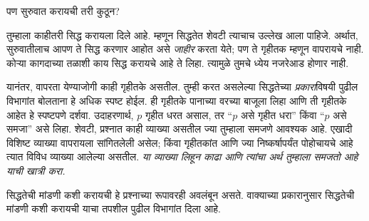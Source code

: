 \documentclass[../../../include/open-logic-section]{subfiles}
\begin{document}


पण सुरुवात करायची तरी कुठून?

तुम्हाला काहीतरी सिद्ध करायला दिले आहे. म्हणून सिद्धतेत शेवटी त्याचाच उल्लेख आला पाहिजे. अर्थात, सुरुवातीलाच आपण ते सिद्ध करणार आहोत असे \emph{जाहीर} करता येते; पण ते गृहीतक म्हणून वापरायचे नाही. कोऱ्या कागदाच्या तळाशी काय सिद्ध करायचे आहे ते लिहा. त्यामुळे तुमचे ध्येय नजरेआड होणार नाही.

यानंतर, वापरता येण्याजोगी काही गृहीतके असतील. तुम्ही करत असलेल्या सिद्धतेच्या \emph{प्रकारा}विषयी पुढील विभागांत बोलताना हे अधिक स्पष्ट होईल. ही गृहीतके पानाच्या वरच्या बाजूला लिहा आणि ती गृहीतके आहेत हे स्पष्टपणे दर्शवा. उदाहरणार्थ, $p$ गृहीत धरत असाल, तर “$p$ असे गृहीत धरा” किंवा “$p$ असे समजा” असे लिहा. शेवटी, प्रश्नात काही व्याख्या असतील ज्या तुम्हाला समजणे आवश्यक आहे. एखादी विशिष्ट व्याख्या वापरायला सांगितलेली असेल; किंवा गृहीतकांत आणि ज्या निष्कर्षापर्यंत पोहोचायचे आहे त्यात विविध व्याख्या आलेल्या असतील. \emph{या व्याख्या लिहून काढा आणि त्यांचा अर्थ तुम्हाला समजतो आहे याची खात्री करा.}

सिद्धतेची मांडणी कशी करायची हे प्रश्नाच्या रूपावरही अवलंबून असते. वाक्याच्या प्रकारानुसार सिद्धतेची मांडणी कशी करायची याचा तपशील पुढील विभागांत दिला आहे.
\end{document}
